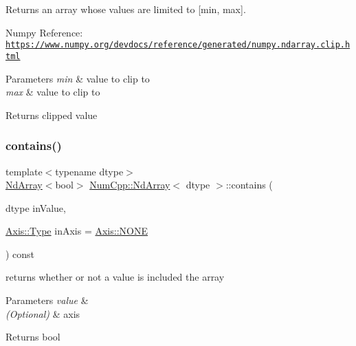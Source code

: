Returns an array whose values are limited to \mbox{[}min, max\mbox{]}.

Numpy Reference\+: \href{https://www.numpy.org/devdocs/reference/generated/numpy.ndarray.clip.html}{\tt https\+://www.\+numpy.\+org/devdocs/reference/generated/numpy.\+ndarray.\+clip.\+html}


\begin{DoxyParams}{Parameters}
{\em min} & value to clip to \\
\hline
{\em max} & value to clip to \\
\hline
\end{DoxyParams}
\begin{DoxyReturn}{Returns}
clipped value 
\end{DoxyReturn}
\mbox{\label{class_num_cpp_1_1_nd_array_a48b6225f33c3aebb09a141a7d3969349}} 
\subsubsection{\texorpdfstring{contains()}{contains()}}
{\footnotesize\ttfamily template$<$typename dtype$>$ \\
\mbox{\hyperlink{class_num_cpp_1_1_nd_array}{Nd\+Array}}$<$bool$>$ \mbox{\hyperlink{class_num_cpp_1_1_nd_array}{Num\+Cpp\+::\+Nd\+Array}}$<$ dtype $>$\+::contains (\begin{DoxyParamCaption}\item[{dtype}]{in\+Value,  }\item[{\mbox{\hyperlink{struct_num_cpp_1_1_axis_ac10eb76f8631762d9ed70c40c42ca6cb}{Axis\+::\+Type}}}]{in\+Axis = {\ttfamily \mbox{\hyperlink{struct_num_cpp_1_1_axis_ac10eb76f8631762d9ed70c40c42ca6cba747ae657022cca1d87702b56d0c038e9}{Axis\+::\+N\+O\+NE}}} }\end{DoxyParamCaption}) const\hspace{0.3cm}{\ttfamily [inline]}}

returns whether or not a value is included the array


\begin{DoxyParams}{Parameters}
{\em value} & \\
\hline
{\em (\+Optional)} & axis \\
\hline
\end{DoxyParams}
\begin{DoxyReturn}{Returns}
bool 
\end{DoxyReturn}
\mbox{\label{class_num_cpp_1_1_nd_array_acbd4b7c0367bd41e06e2c9f71dbcf6be}} 
